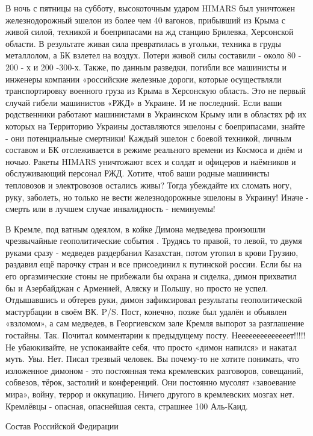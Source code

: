 В ночь с пятницы на субботу, высокоточным ударом HIMARS был уничтожен железнодорожный эшелон из более чем 40 вагонов, прибывший из Крыма с живой силой, техникой и боеприпасами на жд станцию Брилевка, Херсонской области.
В результате живая сила превратилась в угольки, техника в груды металлолом, а БК взлетел на воздух.
Потери живой силы составили - около 80 - 200 - х и 200 -300-х.
Также, по данным разведки, погибли все машинисты и инженеры компании «российские железные дороги, которые осуществляли транспортировку военного груза из Крыма в Херсонскую область.
Это не первый случай гибели машинистов «РЖД» в Украине. И не последний.
Если ваши родственники работают машинистами в Украинском Крыму или в областях рф их которых на Территорию Украины доставляются эшелоны с боеприпасами, знайте - они потенциальные смертники!
Каждый эшелон с боевой техникой, личным составом и БК отслеживается в режиме реального времени из Космоса и днём и ночью.
Ракеты HIMARS уничтожают всех и солдат и офицеров и наёмников и обслуживающий персонал РЖД.
Хотите, чтоб ваши родные машинисты тепловозов и электровозов остались живы? Тогда убеждайте их сломать ногу, руку, заболеть, но только не вести железнодорожные эшелоны в Украину!
Иначе - смерть или в лучшем случае инвалидность - неминуемы!

В Кремле, под ватным одеялом, в койке Димона медведева произошли чрезвычайные геополитические события . Трудясь то правой, то левой, то двумя руками сразу - медведев раздербанил Казахстан, потом утопил в крови Грузию, раздавил ещё парочку стран и все присоединил к путинской россии. Если бы на его оргазмические стоны не прибежали бы охрана и сиделка, димон прихватил бы и Азербайджан с Арменией, Аляску и Польшу, но просто не успел. Отдышавшись и обтерев руки, димон зафиксировал результаты геополитической мастурбации в своём ВК.
P/S. Пост, конечно, позже был удалён и объявлен «взломом», а сам медведев, в Георгиевском зале Кремля выпорот за разглашение гостайны.
Так. Почитал комментарии к предыдущему посту.
Неееееееееееееет!!!!!
Не убаюкивайте, не успокаивайте себя, что просто «димон напился» и накатал муть. Увы. Нет. Писал трезвый человек. Вы почему-то не хотите понимать, что изложенное димоном - это постоянная тема кремлевских разговоров, совещаний, собвезов, тёрок, застолий и конференций. Они постоянно мусолят «завоевание мира», войну, террор и оккупацию. Ничего другого в кремлевских мозгах нет.
Кремлёвцы - опасная, опаснейшая секта, страшнее 100 Аль-Каид.

Состав Российской Федирации

